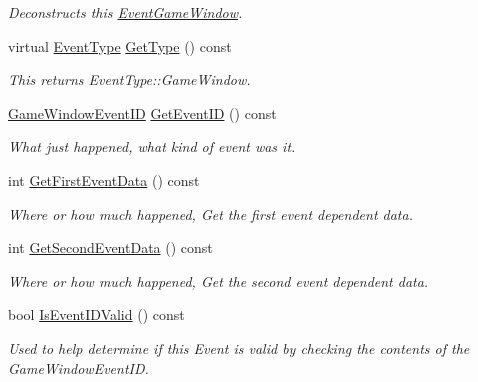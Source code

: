 \begin{DoxyCompactItemize}
\begin{DoxyCompactList}\small\item\em Deconstructs this \hyperlink{classphys_1_1EventGameWindow}{EventGameWindow}. \item\end{DoxyCompactList}\item 
virtual \hyperlink{classphys_1_1EventBase_a5e6a8564e127f654123f0bf6a2751923}{EventType} \hyperlink{classphys_1_1EventGameWindow_ab43a924a6c347823b0af51145974e297}{GetType} () const 
\begin{DoxyCompactList}\small\item\em This returns EventType::GameWindow. \item\end{DoxyCompactList}\item 
\hyperlink{classphys_1_1EventGameWindow_a45225255070513d3cff88cdfea25cc09}{GameWindowEventID} \hyperlink{classphys_1_1EventGameWindow_a9454b837e1f09e3927d3666dc8b5d88b}{GetEventID} () const 
\begin{DoxyCompactList}\small\item\em What just happened, what kind of event was it. \item\end{DoxyCompactList}\item 
int \hyperlink{classphys_1_1EventGameWindow_a28f0c0e000107bcce2b118c8d1657492}{GetFirstEventData} () const 
\begin{DoxyCompactList}\small\item\em Where or how much happened, Get the first event dependent data. \item\end{DoxyCompactList}\item 
int \hyperlink{classphys_1_1EventGameWindow_a477ef27390df3efa13cc37499e841f06}{GetSecondEventData} () const 
\begin{DoxyCompactList}\small\item\em Where or how much happened, Get the second event dependent data. \item\end{DoxyCompactList}\item 
bool \hyperlink{classphys_1_1EventGameWindow_a9717be3e8429e0477be014ac57aa3679}{IsEventIDValid} () const 
\begin{DoxyCompactList}\small\item\em Used to help determine if this Event is valid by checking the contents of the GameWindowEventID. \item\end{DoxyCompactList}\item 

\end{DoxyCompactItemize}
